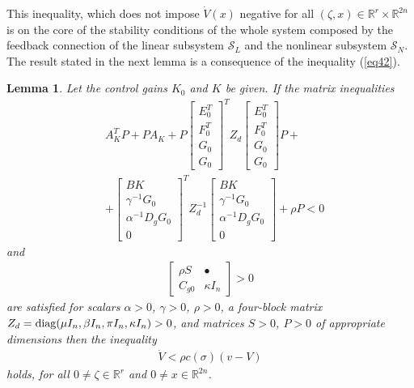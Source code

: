 \documentclass[twocolumn]{autarc_LH}
\newcommand{\Rf}{{\mathbb R}}
\newtheorem{lemma}{Lemma}
\begin{document}
This inequality, which does not impose $\dot V(x)$ negative for all $(\zeta, x) \in \Rf^r \times \Rf^{2n}$ is on the core of the stability conditions of the whole system composed by the feedback connection of the linear subsystem $\mathcal{S}_L$ and the nonlinear subsystem $\mathcal{S}_N$. The result stated in the next lemma is a consequence of the inequality (\ref{eq42}). 
%
\begin{lemma} \label{lemma02}
Let the control gains $K_0$ and $K$ be given. If the matrix inequalities
\begin{equation}
	\begin{aligned}
		\label{eq43}  & A_K^T P + P A_K + P \left [ \begin{array}{c} E_0^T \\ F_0^T \\ G_0 \\ G_0 \end{array} \right ]^T Z_d \left [ \begin{array}{c} E_0^T \\ F_0^T \\ G_0 \\ G_0 \end{array} \right ] P + \\ & + \left [ \begin{array}{c} B K \\ \gamma^{-1} G_0 \\  \alpha^{-1}D_gG_{0} \\ 0 \end{array} \right ]^T Z_d^{-1} \left [ \begin{array}{c} BK \\ \gamma^{-1}G_0 \\ \alpha^{-1}D_gG_{0} \\ 0 \end{array} \right ] + \rho P < 0
	\end{aligned}
\end{equation}
and
\begin{equation}
	\begin{aligned}
		\label{eq44}  \left [ \begin{array}{cc} \rho S &  \bullet \\ C_{g0} & \kappa I_n  \end{array} \right ] > 0
	\end{aligned}
\end{equation}
are satisfied for scalars $\alpha >0$, $\gamma >0$, $\rho>0$, a four-block matrix $Z_d = {\rm diag}(\mu I_n, \beta I_n, \pi I_n, \kappa I_n)>0$, and matrices $S>0$, $P>0$ of appropriate dimensions then the inequality
\begin{align}
		\label{eq45}  \dot V < \rho c(\sigma) ( v - V )
\end{align}
holds, for all $0 \neq \zeta \in \Rf^{r}$ and $0 \neq x \in \Rf^{2n}$.
\end{lemma}
\end{document}
